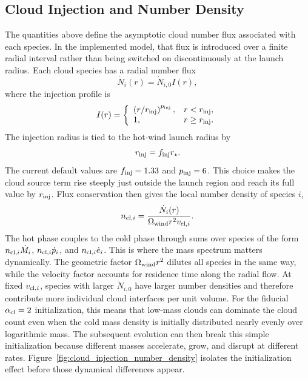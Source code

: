 \subsection{Cloud Injection and Number Density}
\label{subsec:model_cloud_injection}

The quantities above define the asymptotic cloud number flux associated with each species.
In the implemented model, that flux is introduced over a finite radial interval rather than being switched on discontinuously at the launch radius.
Each cloud species has a radial number flux
\begin{equation}
\dot{N}_i(r)
=
\dot{N}_{i,0} I(r),
\end{equation}
where the injection profile is
\begin{equation}
I(r) =
\left\{
\begin{array}{ll}
\left(r/r_{\rm inj}\right)^{p_{\rm inj}}, & r < r_{\rm inj},\\
1, & r \ge r_{\rm inj}.
\end{array}
\right.
\end{equation}
The injection radius is tied to the hot-wind launch radius by
\begin{equation}
r_{\rm inj}
=
f_{\rm inj}r_\star .
\end{equation}
The current default values are $f_{\rm inj}=1.33$ and $p_{\rm inj}=6$.
This choice makes the cloud source term rise steeply just outside the launch region and reach its full value by $r_{\rm inj}$.
Flux conservation then gives the local number density of species $i$,
\begin{equation}
n_{{\rm cl},i}
=
\frac{\dot{N}_i(r)}
{\Omega_{\rm wind} r^2 v_{{\rm cl},i}}.
\end{equation}
The hot phase couples to the cold phase through sums over species of the form $n_{{\rm cl},i}\dot{M}_i$, $n_{{\rm cl},i}\dot{p}_i$, and $n_{{\rm cl},i}\dot{e}_i$.
This is where the mass spectrum matters dynamically.
The geometric factor $\Omega_{\rm wind}r^2$ dilutes all species in the same way, while the velocity factor accounts for residence time along the radial flow.
At fixed $v_{{\rm cl},i}$, species with larger $\dot{N}_{i,0}$ have larger number densities and therefore contribute more individual cloud interfaces per unit volume.
For the fiducial $\alpha_{\rm cl}=2$ initialization, this means that low-mass clouds can dominate the cloud count even when the cold mass density is initially distributed nearly evenly over logarithmic mass.
The subsequent evolution can then break this simple initialization because different masses accelerate, grow, and disrupt at different rates.
Figure~\ref{fig:cloud_injection_number_density} isolates the initialization effect before those dynamical differences appear.

